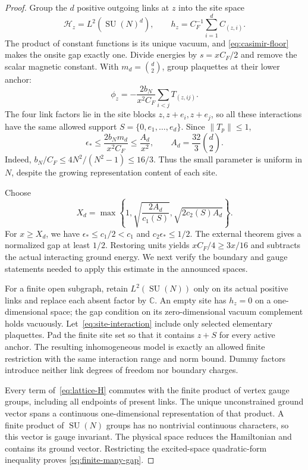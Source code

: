 \documentclass[11pt,letterpaper]{article}
\newcommand{\C}{\mathbb C}
\newcommand{\SU}{\operatorname{SU}}
\theoremstyle{definition}
\numberwithin{equation}{section}
\begin{document}
\begin{proof}
Group the $d$ positive outgoing links at $z$ into the site space
\[
 \mathcal H_z=L^2(\SU(N)^d),\qquad
 h_z=C_F^{-1}\sum_{i=1}^d C_{(z,i)}.
\]
The product of constant functions is its unique vacuum, and
\eqref{eq:casimir-floor} makes the onsite gap exactly one. Divide energies
by $s=xC_F/2$ and remove the scalar magnetic constant. With
$m_d=\binom d2$, group plaquettes at their lower anchor:
\begin{equation}
 \phi_z=-\frac{2b_N}{x^2C_F}\sum_{i<j}T_{(z,ij)}.
 \label{eq:site-interaction}
\end{equation}
The four link factors lie in the site blocks $z,z+e_i,z+e_j$, so all
these interactions have the same allowed support
$S=\{0,e_1,\ldots,e_d\}$. Since $\|T_p\|\le1$,
\begin{equation}
 \epsilon_*\le\frac{2b_Nm_d}{x^2C_F}
 \le\frac{A_d}{x^2},\qquad A_d=\frac{32}{3}\binom d2.
 \label{eq:small-parameter}
\end{equation}
Indeed, $b_N/C_F\le4N^2/(N^2-1)\le16/3$. Thus the small parameter is
uniform in $N$, despite the growing representation content of each site.

Choose
\begin{equation}
 X_d=\max\left\{1,\sqrt{\frac{2A_d}{c_1(S)}},
                       \sqrt{2c_2(S)A_d}\right\}.
 \label{eq:threshold}
\end{equation}
For $x\ge X_d$, we have $\epsilon_*\le c_1/2<c_1$ and
$c_2\epsilon_*\le1/2$. The external theorem gives a normalized gap at
least $1/2$. Restoring units yields $xC_F/4\ge3x/16$ and subtracts the
actual interacting ground energy. We next verify the boundary and gauge
statements needed to apply this estimate in the announced spaces.

For a finite open subgraph, retain $L^2(\SU(N))$ only on its actual
positive links and replace each absent factor by $\C$. An empty site has
$h_z=0$ on a one-dimensional space; the gap condition on its zero-dimensional
vacuum complement holds vacuously. Let~\eqref{eq:site-interaction} include
only selected elementary plaquettes. Pad the finite site set so that it
contains $z+S$ for every active anchor. The resulting inhomogeneous model
is exactly an allowed finite restriction with the same interaction range
and norm bound. Dummy factors introduce neither link degrees of freedom
nor boundary charges.

Every term of~\eqref{eq:lattice-H} commutes with the finite product of
vertex gauge groups, including all endpoints of present links. The unique
unconstrained ground vector spans a continuous one-dimensional
representation of that product. A finite product of $\SU(N)$ groups has
no nontrivial continuous characters, so this vector is gauge invariant.
The physical space reduces the Hamiltonian and contains its ground vector.
Restricting the excited-space quadratic-form inequality proves
\eqref{eq:finite-many-gap}.


\end{proof}
\end{document}
